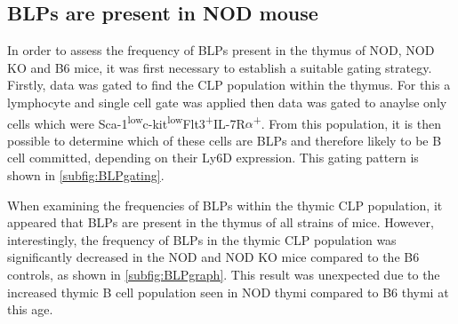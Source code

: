 	
	
	




\subsection{BLPs are present in NOD mouse}

In order to assess the frequency of BLPs present in the thymus of NOD, NOD KO and B6 mice, it was first necessary to establish a suitable gating strategy.
Firstly, data was gated to find the CLP population within the thymus.
For this a lymphocyte and single cell gate was applied then data was gated to anaylse only cells which were Sca-1\textsuperscript{low}c-kit\textsuperscript{low}Flt3\textsuperscript{+}IL-7R$\alpha$\textsuperscript{+}.
From this population, it is then possible to determine which of these cells are BLPs and therefore likely to be B cell committed, depending on their Ly6D expression.
This gating pattern is shown in \cref{subfig:BLPgating}.

When examining the frequencies of BLPs within the thymic CLP population, it appeared that BLPs are present in the thymus of all strains of mice.
However, interestingly, the frequency of BLPs in the thymic CLP population was significantly decreased in the NOD and NOD KO mice compared to the B6 controls, as shown in \cref{subfig:BLPgraph}.
This result was unexpected due to the increased thymic B cell population seen in NOD thymi compared to B6 thymi at this age.

